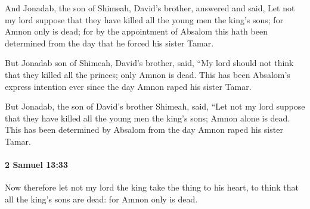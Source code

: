 			\begin{versebox}
					\item[BHS] 
					\item[ASV] And Jonadab, the son of Shimeah, David's brother, answered and said, Let not my lord suppose that they have killed all the young men the king's sons; for Amnon only is dead; for by the appointment of Absalom this hath been determined from the day that he forced his sister Tamar.
					\item[NIV] But Jonadab son of Shimeah, David’s brother, said, “My lord should not think that they killed all the princes; only Amnon is dead. This has been Absalom’s express intention ever since the day Amnon raped his sister Tamar.
					\item[NRSV] But Jonadab, the son of David’s brother Shimeah, said, “Let not my lord suppose that they have killed all the young men the king’s sons; Amnon alone is dead. This has been determined by Absalom from the day Amnon raped his sister Tamar.
			\end{versebox}

		\paragraph{2 Samuel 13:33} %
			\label{2SAMUEL-13-33}

			Now therefore let not my lord the king take the thing to his heart, to think that all the king’s sons are dead: for Amnon only is dead.

